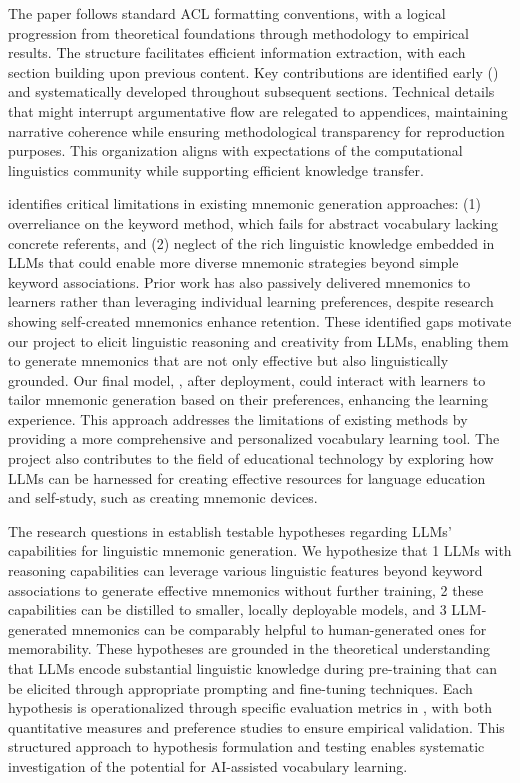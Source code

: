  The paper follows standard ACL formatting conventions, with a logical progression from theoretical foundations through methodology to empirical results. The structure facilitates efficient information extraction, with each section building upon previous content. Key contributions are identified early () and systematically developed throughout subsequent sections. Technical details that might interrupt argumentative flow are relegated to appendices, maintaining narrative coherence while ensuring methodological transparency for reproduction purposes. This organization aligns with expectations of the computational linguistics community while supporting efficient knowledge transfer.

  identifies critical limitations in existing mnemonic generation approaches: (1) overreliance on the keyword method, which fails for abstract vocabulary lacking concrete referents, and (2) neglect of the rich linguistic knowledge embedded in LLMs that could enable more diverse mnemonic strategies beyond simple keyword associations. Prior work has also passively delivered mnemonics to learners rather than leveraging individual learning preferences, despite research showing self-created mnemonics enhance retention. These identified gaps motivate our project to elicit linguistic reasoning and creativity from LLMs, enabling them to generate mnemonics that are not only effective but also linguistically grounded. Our final model, \linksys, after deployment, could interact with learners to tailor mnemonic generation based on their preferences, enhancing the learning experience. This approach addresses the limitations of existing methods by providing a more comprehensive and personalized vocabulary learning tool. The project also contributes to the field of educational technology by exploring how LLMs can be harnessed for creating effective resources for language education and self-study, such as creating mnemonic devices.

 The research questions in  establish testable hypotheses regarding LLMs' capabilities for linguistic mnemonic generation. We hypothesize that \numlist{1} LLMs with reasoning capabilities can leverage various linguistic features beyond keyword associations to generate effective mnemonics without further training, \numlist{2} these capabilities can be distilled to smaller, locally deployable models, and \numlist{3} LLM-generated mnemonics can be comparably helpful to human-generated ones for memorability. These hypotheses are grounded in the theoretical understanding that LLMs encode substantial linguistic knowledge during pre-training that can be elicited through appropriate prompting and fine-tuning techniques. Each hypothesis is operationalized through specific evaluation metrics in , with both quantitative measures and preference studies to ensure empirical validation. This structured approach to hypothesis formulation and testing enables systematic investigation of the potential for AI-assisted vocabulary learning.

